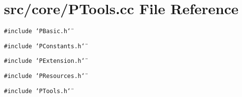 \section{src/core/PTools.cc File Reference}
\label{PTools_8cc}


{\tt \#include \char`\"{}PBasic.h\char`\"{}}\par
{\tt \#include \char`\"{}PConstants.h\char`\"{}}\par
{\tt \#include \char`\"{}PExtension.h\char`\"{}}\par
{\tt \#include \char`\"{}PResources.h\char`\"{}}\par
{\tt \#include \char`\"{}PTools.h\char`\"{}}\par
